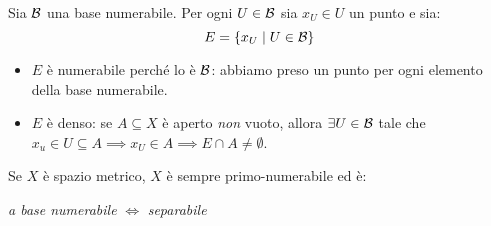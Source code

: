 \begin{demonstration}
	Sia $\mathcal{B}$ una base numerabile. Per ogni $U\in\mathcal{B}$ sia $x_U\in U$ un punto e sia:
	\begin{equation*}
		E=\left\{x_U\mid U\in \mathcal{B}\right\}
	\end{equation*}
\begin{itemize}
	\item $E$ è numerabile perché lo è $\mathcal{B}$: abbiamo preso un punto per ogni elemento della base numerabile.
	\item $E$ è denso: se $A\subseteq X$ è aperto \textit{non} vuoto, allora $\exists U\in\mathcal{B}$ tale che $x_u\in U\subseteq A\implies x_U\in A\implies E\cap A\neq \emptyset$.
\end{itemize}
\end{demonstration}
\begin{proposition}
	Se $X$ è spazio metrico, $X$ è sempre primo-numerabile ed è:
	\begin{center}
		\textit{a base numerabile} $\iff$ \textit{separabile}
	\end{center}
\vspace{-6mm}
\end{proposition}

